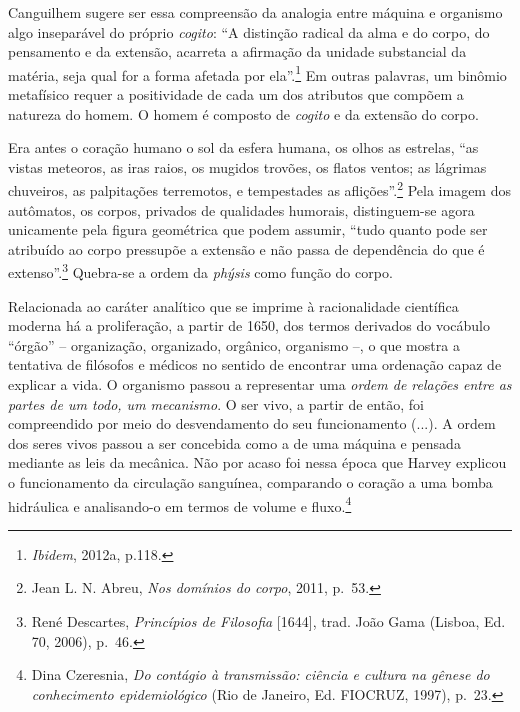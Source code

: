 Canguilhem sugere ser essa compreensão da analogia entre máquina e
organismo algo inseparável do próprio \emph{cogito}: ``A distinção
radical da alma e do corpo, do pensamento e da extensão, acarreta a
afirmação da unidade substancial da matéria, seja qual for a forma
afetada por ela''.\footnote{\emph{Ibidem}, 2012a, p.118.} Em outras
palavras, um binômio metafísico requer a positividade de cada um dos
atributos que compõem a natureza do homem. O homem é composto de
\emph{cogito} e da extensão do corpo.

Era antes o coração humano o sol da esfera humana, os olhos as estrelas,
``as vistas meteoros, as iras raios, os mugidos trovões, os flatos
ventos; as lágrimas chuveiros, as palpitações terremotos, e tempestades
as aflições''.\footnote{Jean L. N. Abreu, \emph{Nos domínios do corpo},
  2011, p.~53.} Pela imagem dos autômatos, os corpos, privados de
qualidades humorais, distinguem-se agora unicamente pela figura
geométrica que podem assumir, ``tudo quanto pode ser atribuído ao corpo
pressupõe a extensão e não passa de dependência do que é
extenso''.\footnote{René Descartes, \emph{Princípios de Filosofia}
  {[}1644{]}, trad. João Gama (Lisboa, Ed. 70, 2006), p.~46.} Quebra-se
a ordem da \emph{phýsis} como função do corpo.

Relacionada ao caráter analítico que se imprime à racionalidade
científica moderna há a proliferação, a partir de 1650, dos termos
derivados do vocábulo ``órgão'' -- organização, organizado, orgânico,
organismo --, o que mostra a tentativa de filósofos e médicos no sentido
de encontrar uma ordenação capaz de explicar a vida. O organismo passou
a representar uma \emph{ordem de relações entre as partes de um todo, um
mecanismo}. O ser vivo, a partir de então, foi compreendido por meio do
desvendamento do seu funcionamento (...). A ordem dos seres vivos passou
a ser concebida como a de uma máquina e pensada mediante as leis da
mecânica. Não por acaso foi nessa época que Harvey explicou o
funcionamento da circulação sanguínea, comparando o coração a uma bomba
hidráulica e analisando-o em termos de volume e fluxo.\footnote{Dina
  Czeresnia, \emph{Do contágio à transmissão: ciência e cultura na
  gênese do conhecimento epidemiológico} (Rio de Janeiro, Ed. FIOCRUZ,
  1997), p.~23.}

